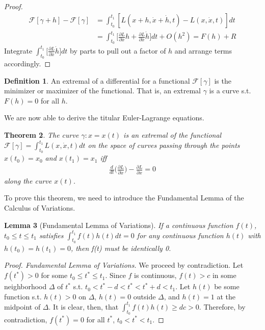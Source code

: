 \documentclass[10pt, psamsfonts]{amsart}
\newtheorem{thm}{Theorem}[section]
\newtheorem{lem}[thm]{Lemma}
\theoremstyle{definition}
\newtheorem{defn}[thm]{Definition}
\theoremstyle{remark}
\numberwithin{equation}{section}
\begin{document}
\begin{proof}
\begin{align*}
      \mathcal{F}[\gamma + h] - \mathcal{F}[\gamma] & = \int_{t_0}^{t_1} [L(x+h, \dot{x} + \dot{h}, t) - L(x, \dot{x}, t)] dt\\
      & = \int_{t_0}^{t_1} \bigg[ \frac{\partial L}{\partial x} h + \frac{\partial L}{\partial \dot{x}} \dot{h} \bigg] dt + O(h^2) = F(h) + R
\end{align*}
  Integrate $\int_{t_0}^{t_1} \big[\frac{\partial L}{\partial \dot{x}} \dot{h}\big] dt$
   by parts to pull out a factor of $h$ and arrange terms accordingly.
\end{proof}

\begin{defn}
An extremal of a differential for a functional $\mathcal{F}[\gamma]$ is the minimizer or maximizer of the functional. That is, an extremal $\gamma$ is a curve s.t. $F(h) = 0$ for all $h$.
\end{defn}

We are now able to derive the titular Euler-Lagrange equations.
\begin{thm}
  The curve $\gamma: x = x(t)$ is an extremal of the functional $\mathcal{F}[\gamma] = \int_{t_0}^{t_1} L(x,\dot{x},t)dt $ on the space of curves passing through the points $x(t_0) = x_0$ and $x(t_1) = x_1$ iff
  \begin{align}
      \label{eq:Theorem 1.5}
    \frac{d}{dt} \bigg(\frac{\partial L}{\partial \dot{x}} \bigg) - \frac{\partial L}{\partial x} = 0 
  \end{align}
  along the curve $x(t)$.
\end{thm}

\noindent To prove this theorem, we need to introduce the Fundamental Lemma of the Calculus of Variations.

\begin{lem}[Fundamental Lemma of Variations]
  If a continuous function $f(t)$, $t_0\leq t \leq t_1$ satisfies $\int_{t_0}^{t_1} f(t) h(t) dt = 0$ for any continuous function $h(t)$ with $h(t_0) = h(t_1) = 0$, then f(t) must be identically 0.
\end{lem}

\begin{proof}[Proof. Fundamental Lemma of Variations]
We proceed by contradiction. Let $f(t^*) > 0$ for some $t_0 \leq t^* \leq t_1$. Since $f$ is continuous, $f(t) > c$ in some neighborhood $\Delta$ of $t^*$ s.t. $t_0 < t^* - d < t^* < t^* + d < t_1$. Let $h(t)$ be some function s.t. $h(t) > 0$ on $\Delta$, $h(t)=0$ outside $\Delta$, and $h(t) = 1$ at the midpoint of $\Delta$. It is clear, then, that $\int_{t_0}^{t_1}f(t)h(t) \geq dc > 0$. Therefore, by contradiction, $f(t^*) = 0$ for all $t^*$, $t_0 < t^* < t_1$. 
\end{proof}
\end{document}
